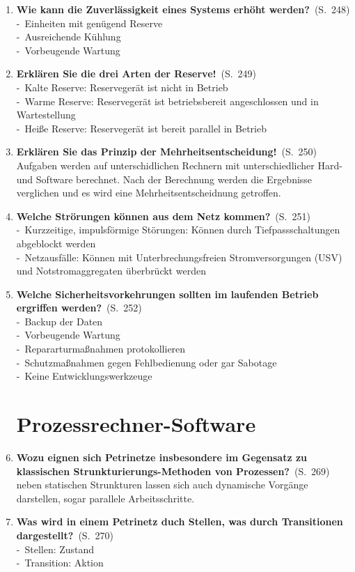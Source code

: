\documentclass[a4paper,12pt]{article}
\newcommand{\question}[3]{\pagebreak[3]\item {\textbf{#1?}}\ (S.\ #2)#3}
\newcommand{\statement}[3]{\pagebreak[3]\item {\textbf{#1!}}\ (S.\ #2)#3}
\newcommand{\catchword}[1]{\\-\ #1}
\newcommand{\normaltext}[1]{\\#1}
\newcommand{\page}[1]{#1}
\begin{document}
\begin{enumerate}
  \question{Wie kann die Zuverlässigkeit eines Systems erhöht werden}{\page{248}}
  {
    \catchword{Einheiten mit genügend Reserve}
    \catchword{Ausreichende Kühlung}
    \catchword{Vorbeugende Wartung}
  }

  \statement{Erklären Sie die drei Arten der Reserve}{\page{249}}
  {
    \catchword{Kalte Reserve: Reservegerät ist nicht in Betrieb}
    \catchword{Warme Reserve: Reservegerät ist betriebsbereit angeschlossen und
               in Wartestellung}
    \catchword{Heiße Reserve: Reservegerät ist bereit parallel in Betrieb}
  }

  \statement{Erklären Sie das Prinzip der Mehrheitsentscheidung}{\page{250}}
  {
    \normaltext{Aufgaben werden auf unterschidlichen Rechnern mit unterschiedlicher Hard-
                und Software berechnet. Nach der Berechnung werden die Ergebnisse verglichen
                und es wird eine Mehrheitsentscheidnung getroffen.}
  }

  \question{Welche Strörungen können aus dem Netz kommen}{\page{251}}
  {
    \catchword{Kurzzeitige, impulsförmige Störungen: Können durch Tiefpassschaltungen
               abgeblockt werden}
    \catchword{Netzausfälle: Können mit Unterbrechungsfreien Stromversorgungen (USV) und
               Notstromaggregaten überbrückt werden}
  }

  \question{Welche Sicherheitsvorkehrungen sollten im laufenden Betrieb ergriffen werden}{\page{252}}
  {
    \catchword{Backup der Daten}
    \catchword{Vorbeugende Wartung}
    \catchword{Repararturmaßnahmen protokollieren}
    \catchword{Schutzmaßnahmen gegen Fehlbedienung oder gar Sabotage}
    \catchword{Keine Entwicklungswerkzeuge}
  }

  \newpage
  \section{Prozessrechner-Software}
  


  \question{Wozu eignen sich Petrinetze insbesondere im Gegensatz zu 
    klassischen Strunkturierungs-Methoden von Prozessen}{\page{269}}
  {
    \normaltext{neben statischen Strunkturen lassen sich auch dynamische 
   Vorgänge darstellen, sogar parallele Arbeitsschritte.}
  }
  
      \question{Was wird in einem Petrinetz duch Stellen, was durch Transitionen
      dargestellt}{\page{270}}
  {
    \catchword{Stellen: Zustand}
    \catchword{Transition: Aktion}
  }
  

\end{enumerate}
\end{document}
